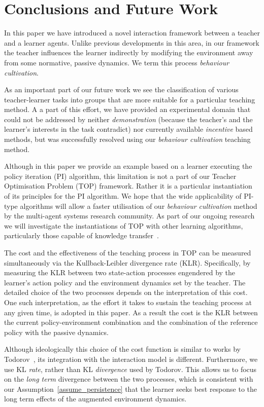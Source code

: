 \section{Conclusions and Future Work}\label{sec: future work}

In this paper we have introduced a novel interaction framework between
a teacher and a learner agents. Unlike previous developments in this
area, in our framework the teacher influences the learner indirectly by
modifying the environment away from some normative, passive
dynamics. We term this process {\em behaviour cultivation}.

As an important part of our future work we see the classification of
various teacher-learner tasks into groups that are more suitable for a
particular teaching method. A a part of this effort, we have provided
an experimental domain that could not be addressed by neither {\em
  demonstration} (because the teacher's and the learner's interests in
the task contradict) nor currently available {\em incentive} based
methods, but was successfully resolved using our {\em behaviour
  cultivation} teaching method.

Although in this paper we provide an example based on a learner
executing the policy iteration (PI) algorithm, this limitation is not
a part of our Teacher Optimisation Problem (TOP) framework. Rather it
is a particular instantiation of its principles for the PI
algorithm. We hope that the wide applicability of PI-type algorithms
will allow a faster utilisation of our {\em behaviour cultivation}
method by the multi-agent systems research community. As part of our
ongoing research we will investigate the instantiations of TOP with
other learning algorithms, particularly those capable of knowledge
transfer~\cite{taylor_stone_2009,taylor_PhD_2008}.

The cost and the effectiveness of the teaching process in TOP can be
measured simultaneously via the Kullback-Leibler divergence rate
(KLR). Specifically, by measuring the KLR between two state-action
processes engendered by the learner's action policy and the
environment dynamics set by the teacher. The detailed choice of the
two processes depends on the interpretation of this cost. One such
interpretation, as the effort it takes to sustain the teaching process
at any given time, is adopted in this paper. As a result the cost is
the KLR between the current policy-environment combination and the
combination of the reference policy with the passive dynamics.

Although ideologically this choice of the cost function is similar to
works by
Todorov~\cite{todorov_2009_framework,todorov_2009_framework_sup}, its
integration with the interaction model is different. Furthermore, we
use KL {\em rate}, rather than KL {\em divergence} used by
Todorov. This allows us to focus on the {\em long term} divergence
between the two processes, which is consistent with our
Assumption~\ref{assume_persistence} that the learner seeks best
response to the long term effects of the augmented environment
dynamics.


